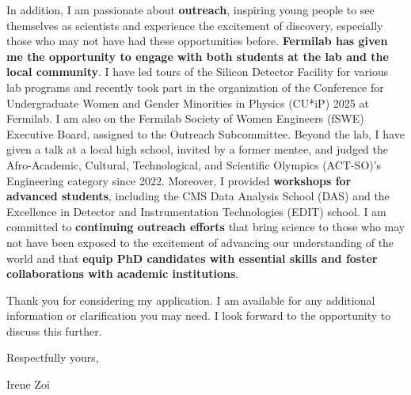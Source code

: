 {\begin{flushleft}

\vskip 10pt
In addition, I am passionate about {\bf outreach}, inspiring young people to see themselves as scientists and experience the excitement of discovery, especially those who may not have had these opportunities before. {\bf Fermilab has given me the opportunity to engage with both students at the lab and the local community}. I have led tours of the Silicon Detector Facility for various lab programs and recently took part in the organization of the Conference for Undergraduate Women and Gender Minorities in Physics (CU*iP) 2025 at Fermilab. I am also on the Fermilab Society of Women Engineers (fSWE) Executive Board, assigned to the Outreach Subcommittee. Beyond the lab, I have given a talk at a local high school, invited by a former mentee, and judged the Afro-Academic, Cultural, Technological, and Scientific Olympics (ACT-SO)’s Engineering category since 2022. Moreover, I  provided {\bf workshops for advanced students}, including the CMS Data Analysis School (DAS) and the Excellence in Detector and Instrumentation Technologies (EDIT) school. I am committed to {\bf continuing outreach efforts} that bring science to those who may not have been exposed to the excitement of advancing our understanding of the world and that {\bf equip PhD candidates with essential skills and foster collaborations with academic institutions}.

Thank you for considering my application. I am available for any additional information or clarification you may need. I look forward to the opportunity to discuss this further.

Respectfully yours,

Irene Zoi
\end{flushleft}

}